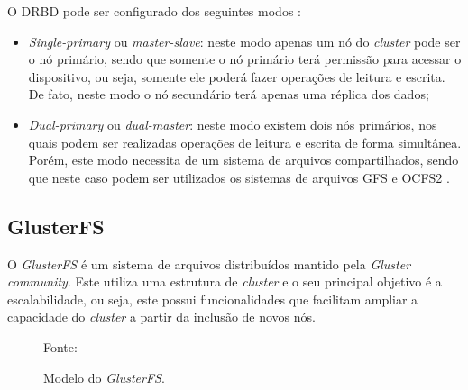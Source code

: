 O \ac{DRBD} pode ser configurado dos seguintes modos \cite{drbd}:
\begin{itemize}
 \item \textit{Single-primary} ou \textit{master-slave}: neste modo apenas um nó do \textit{cluster} pode ser o nó primário, sendo que somente
 o nó primário terá permissão para acessar o dispositivo, ou seja, somente ele poderá fazer operações de leitura e escrita. De fato, neste modo 
 o nó secundário terá apenas uma réplica dos dados;
 \item \textit{Dual-primary} ou \textit{dual-master}: neste modo existem dois nós primários, nos quais podem ser realizadas operações de leitura e 
 escrita de forma simultânea. Porém, este modo necessita de um sistema de arquivos compartilhados, sendo que neste caso podem ser utilizados os
 sistemas de arquivos \ac{GFS} \cite{gfs} e \ac{OCFS2} \cite{ocfs2}.
\end{itemize}

\subsection{GlusterFS}
\label{section:glusterfs}
O \textit{GlusterFS} \cite{glusterfs} é um sistema de arquivos distribuídos mantido pela \textit{Gluster community}. Este utiliza uma estrutura 
de \textit{cluster} e o seu principal objetivo é a escalabilidade, ou seja, este possui funcionalidades que facilitam ampliar a capacidade 
do \textit{cluster} a partir da inclusão de novos nós.

\begin{figure}[h!]
 \centering
 \caption{Modelo do \textit{GlusterFS}.}
 Fonte: \citet{davies2013}
 \label{fig:glusterfs}
\end{figure}

